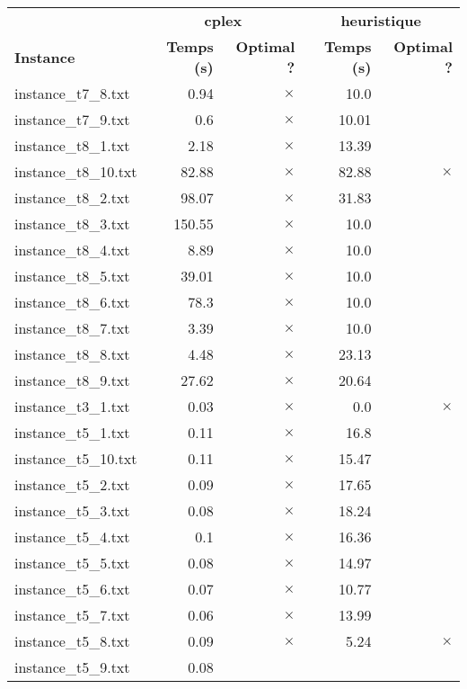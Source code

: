 \documentclass{article}
\begin{document}
\newpage
\begin{center}
\renewcommand{\arraystretch}{1.4} 
 \begin{tabular}{lrrrr}
	\hline
 & \multicolumn{2}{c}{\textbf{cplex}} & \multicolumn{2}{c}{\textbf{heuristique}}\\
\textbf{Instance}  & \textbf{Temps (s)} & \textbf{Optimal ?}  & \textbf{Temps (s)} & \textbf{Optimal ?} \\\hline

instance\_t7\_8.txt & 0.94 & 
$\times$
 & 10.0 & 
\\
instance\_t7\_9.txt & 0.6 & 
$\times$
 & 10.01 & 
\\
instance\_t8\_1.txt & 2.18 & 
$\times$
 & 13.39 & 
\\
instance\_t8\_10.txt & 82.88 & 
$\times$
 & 82.88 & 
$\times$
\\
instance\_t8\_2.txt & 98.07 & 
$\times$
 & 31.83 & 
\\
instance\_t8\_3.txt & 150.55 & 
$\times$
 & 10.0 & 
\\
instance\_t8\_4.txt & 8.89 & 
$\times$
 & 10.0 & 
\\
instance\_t8\_5.txt & 39.01 & 
$\times$
 & 10.0 & 
\\
instance\_t8\_6.txt & 78.3 & 
$\times$
 & 10.0 & 
\\
instance\_t8\_7.txt & 3.39 & 
$\times$
 & 10.0 & 
\\
instance\_t8\_8.txt & 4.48 & 
$\times$
 & 23.13 & 
\\
instance\_t8\_9.txt & 27.62 & 
$\times$
 & 20.64 & 
\\
instance\_t3\_1.txt & 0.03 & 
$\times$
 & 0.0 & 
$\times$
\\
instance\_t5\_1.txt & 0.11 & 
$\times$
 & 16.8 & 
\\
instance\_t5\_10.txt & 0.11 & 
$\times$
 & 15.47 & 
\\
instance\_t5\_2.txt & 0.09 & 
$\times$
 & 17.65 & 
\\
instance\_t5\_3.txt & 0.08 & 
$\times$
 & 18.24 & 
\\
instance\_t5\_4.txt & 0.1 & 
$\times$
 & 16.36 & 
\\
instance\_t5\_5.txt & 0.08 & 
$\times$
 & 14.97 & 
\\
instance\_t5\_6.txt & 0.07 & 
$\times$
 & 10.77 & 
\\
instance\_t5\_7.txt & 0.06 & 
$\times$
 & 13.99 & 
\\
instance\_t5\_8.txt & 0.09 & 
$\times$
 & 5.24 & 
$\times$
\\
instance\_t5\_9.txt & 0.08 & 

\end{tabular}
\end{center}
\end{document}
